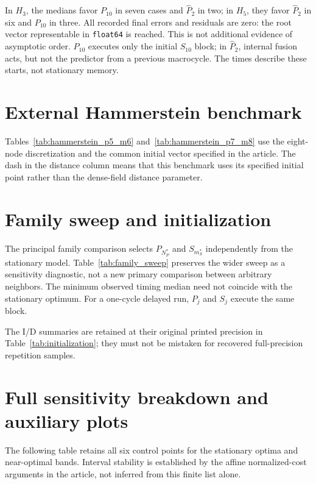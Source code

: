 \documentclass[11pt]{article}
\begin{document}
In $H_3$, the medians favor $P_{10}$ in seven cases and $\widehat P_2$ in two; in $H_5$, they favor $\widehat P_2$ in six and $P_{10}$ in three. All recorded final errors and residuals are zero: the root vector representable in \texttt{float64} is reached. This is not additional evidence of asymptotic order. $P_{10}$ executes only the initial $S_{10}$ block; in $\widehat P_2$, internal fusion acts, but not the predictor from a previous macrocycle. The times describe these starts, not stationary memory.


\section{External Hammerstein benchmark}
Tables~\ref{tab:hammerstein_p5_m6} and~\ref{tab:hammerstein_p7_m8} use the eight-node discretization and the common initial vector specified in the article. The dash in the distance column means that this benchmark uses its specified initial point rather than the dense-field distance parameter.



\clearpage
\section{Family sweep and initialization}
The principal family comparison selects $P_{N_P^*}$ and $S_{m_S^*}$ independently from the stationary model. Table~\ref{tab:family_sweep} preserves the wider sweep as a sensitivity diagnostic, not a new primary comparison between arbitrary neighbors. The minimum observed timing median need not coincide with the stationary optimum. For a one-cycle delayed run, $P_j$ and $S_j$ execute the same block.

The I/D summaries are retained at their original printed precision in Table~\ref{tab:initialization}; they must not be mistaken for recovered full-precision repetition samples.


\section{Full sensitivity breakdown and auxiliary plots}
The following table retains all six control points for the stationary optima and near-optimal bands. Interval stability is established by the affine normalized-cost arguments in the article, not inferred from this finite list alone.

\end{document}
